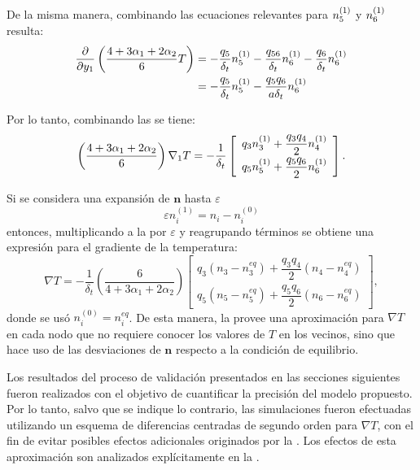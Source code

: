 De la misma manera, combinando las ecuaciones relevantes para $n_{5}^{(1)}$ y $n_{6}^{(1)}$ resulta:
\begin{equation}
\begin{aligned}
	\dfrac{\partial}{\partial y_1} \left( \dfrac{4+3\alpha_1+2\alpha_2}{6} T \right) &= -\dfrac{q_5}{\delta_t} n_{5}^{(1)} - \dfrac{q_{56}}{\delta_t} n_{6}^{(1)} - \dfrac{q_6}{\delta_t} n_{6}^{(1)} \\
	&= -\dfrac{q_5}{\delta_t} n_{5}^{(1)} - \dfrac{q_5 q_6}{a \delta_t} n_{6}^{(1)}
\end{aligned}
	\label{eq:partial_1_y}
\end{equation}

Por lo tanto, combinando las  se tiene:
\begin{equation}
	\left( \dfrac{4+3\alpha_1+2\alpha_2}{6} \right) \nabla_1 T= -\dfrac{1}{\delta_t}
	\left[ 
 	\begin{array}{c} 
 		q_3 n_{3}^{(1)}  +  \dfrac{q_3q_4}{2}n_{4}^{(1)} \\[2mm]
 		q_5 n_{5}^{(1)}  +  \dfrac{q_5q_6}{2}n_{6}^{(1)}
 	\end{array} 
	\right].
	\label{eq:grad1_T}
\end{equation}

Si se considera una expansi\'on de $\bm{n}$ hasta $\varepsilon$
\begin{equation}
	\varepsilon n_i^{(1)} = n_i - n_i^{(0)}
\end{equation}
entonces, multiplicando a la  por $\varepsilon$ y reagrupando t\'erminos se obtiene una expresi\'on para el gradiente de la temperatura:
\begin{equation}
	\nabla T= -\dfrac{1}{\delta_t}\left( \dfrac{6}{4+3\alpha_1+2\alpha_2} \right)
	\left[ 
 	\begin{array}{c} 
 		q_3 (n_3 - n_3^{eq})  +  \dfrac{q_3q_4}{2} (n_4 - n_4^{eq}) \\[2mm]
 		q_5 (n_5 - n_5^{eq})  +  \dfrac{q_5q_6}{2} (n_6 - n_6^{eq})
 	\end{array} 
	\right],
	\label{eq:gradT_2d}
\end{equation}
donde se us\'o $n_i^{(0)} = n_i^{eq}$. De esta manera, la  provee una aproximaci\'on para $\nabla T$ en cada nodo que no requiere conocer los valores de $T$ en los vecinos, sino que hace uso de las desviaciones de $\bm{n}$ respecto a la condici\'on de equilibrio.

Los resultados del proceso de validaci\'on presentados en las secciones siguientes fueron realizados con el objetivo de cuantificar la precisi\'on del modelo propuesto. Por lo tanto, salvo que se indique lo contrario, las simulaciones fueron efectuadas utilizando un esquema de diferencias centradas de segundo orden para $\nabla T$, con el fin de evitar posibles efectos adicionales originados por la . Los efectos de esta aproximaci\'on son analizados expl\'icitamente en la .



